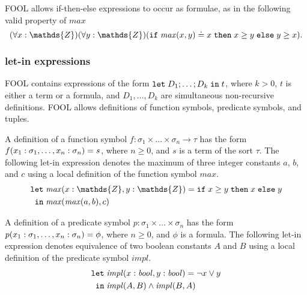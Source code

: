 \documentclass{easychair}
\begin{document}
FOOL allows if-then-else expressions to occur as formulae, as in the
following valid property of $\mathit{max}$
\begin{equation}\label{eq:ite-f-example}
(\forall x:\mathds{Z})(\forall y:\mathds{Z})
(\ite{\mathit{max}(x, y) \eql x}{x \geq y}{y \geq x}).
\end{equation}

\subsubsection{let-in expressions}
FOOL contains expressions of the form $\mathtt{let}\;{D_1;\ldots;D_k}\;\allowbreak\mathtt{in}\;{t}$, where
$k > 0$, $t$ is either a term or a formula, and $D_1,\ldots,D_k$ are
simultaneous non-recursive definitions. FOOL allows definitions of function
symbols, predicate symbols, and tuples.

A definition of a function symbol $f:\sigma_1\times\ldots\times\sigma_n\to\tau$
has the form ${f(x_1:\sigma_1,\ldots,x_n:\sigma_n)}={s}$, where
$n \geq 0$, and $s$ is a term of the sort $\tau$.
The following let-in expression denotes the maximum of three integer constants
$a$, $b$, and $c$ using a local definition of the function symbol
$\mathit{max}$.
\begin{equation}\label{eq:fool-let-impl}
\begin{aligned}
\mathtt{let}\;&\binding{\mathit{max}(x:\mathds{Z},y:\mathds{Z})}
                       {\ite{x \geq y}{x}{y}}\\
 \mathtt{in}\;&\mathit{max}(\mathit{max}(a,b),c)
\end{aligned}
\end{equation}

A definition of a predicate symbol $p:\sigma_1\times\ldots\times\sigma_n$ has 
the form ${p(x_1:\sigma_1,\ldots,x_n:\sigma_n)}={\phi}$, where 
$n \geq 0$, and $\phi$ is a formula.
The following let-in expression denotes equivalence of two boolean constants 
$A$ and $B$ using a local definition of the predicate symbol $\mathit{impl}$.
\begin{equation}\label{eq:fool-let-impl}
\begin{aligned}
\mathtt{let}\;&{\mathit{impl}(x:\mathit{bool},y:\mathit{bool})}={\neg x \lor y}\\
 \mathtt{in}\;&\mathit{impl}(A,B)\wedge\mathit{impl}(B,A)
\end{aligned}
\end{equation}
\end{document}
